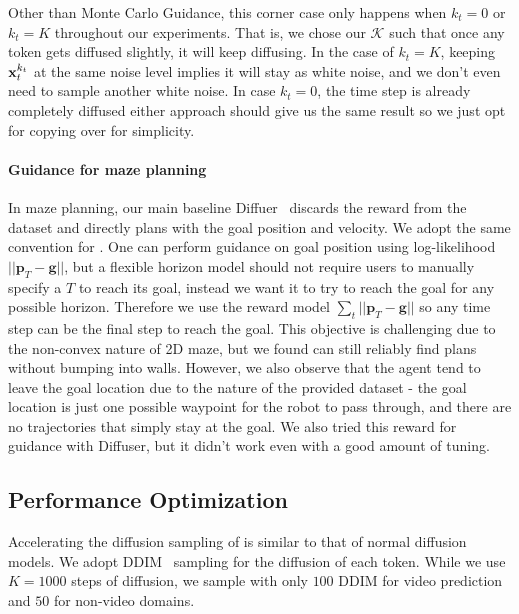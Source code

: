 Other than Monte Carlo Guidance, this corner case only happens when $k_t=0$ or $k_t=K$ throughout our experiments. That is, we chose our $\mathcal{K}$ such that once any token gets diffused slightly, it will keep diffusing. In the case of $k_t=K$, keeping $\mathbf{x}_t^{k_t}$ at the same noise level implies it will stay as white noise, and we don't even need to sample another white noise. In case $k_t=0$, the time step is already completely diffused either approach should give us the same result so we just opt for copying over for simplicity.

\paragraph{Guidance for maze planning}
\label{app:maze_guidance}
In maze planning, our main baseline Diffuer~\cite{janner2022planning} discards the reward from the dataset and directly plans with the goal position and velocity. We adopt the same convention for \algo{}. One can perform guidance on goal position using log-likelihood $||\mathbf{p}_T-\mathbf{g}||$, but a flexible horizon model should not require users to manually specify a $T$ to reach its goal, instead we want it to try to reach the goal for any possible horizon. Therefore we use the reward model $\sum_t ||\mathbf{p}_T-\mathbf{g}||$ so any time step can be the final step to reach the goal. This objective is challenging due to the non-convex nature of 2D maze, but we found \algo{} can still reliably find plans without bumping into walls. However, we also observe that the agent tend to leave the goal location due to the nature of the provided dataset - the goal location is just one possible waypoint for the robot to pass through, and there are no trajectories that simply stay at the goal. We also tried this reward for guidance with Diffuser, but it didn't work even with a good amount of tuning.


\subsection{Performance Optimization}
Accelerating the diffusion sampling of \algo{} is similar to that of normal diffusion models. We adopt DDIM~\cite{ddim} sampling for the diffusion of each token. While we use $K=1000$ steps of diffusion, we sample with only $100$ DDIM for video prediction and $50$ for non-video domains.

